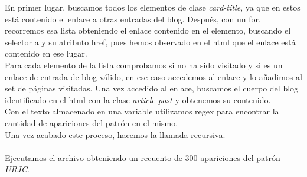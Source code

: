 \documentclass[12pt, a4paper,twoside,titlepage]{article}
\begin{document}
En primer lugar, buscamos todos los elementos de clase \emph{card-title}, ya que en estos está contenido el enlace a otras entradas del blog. Después, con un for, recorremos esa lista obteniendo el enlace contenido en el elemento, buscando el selector a y su atributo href, pues hemos observado en el html que el enlace está contenido en ese lugar.\\

Para cada elemento de la lista comprobamos si no ha sido visitado y si es un enlace de entrada de blog válido, en ese caso accedemos al enlace y lo añadimos al set de páginas visitadas. Una vez accedido al enlace, buscamos el cuerpo del blog identificado en el html con la clase \emph{article-post} y obtenemos su contenido.\\

Con el texto almacenado en una variable utilizamos regex para encontrar la cantidad de apariciones del patrón en el mismo.\\

Una vez acabado este proceso, hacemos la llamada recursiva.\\

\\

Ejecutamos el archivo obteniendo un recuento de 300 apariciones del patrón \emph{URJC}.

\clearpage
\end{document}

